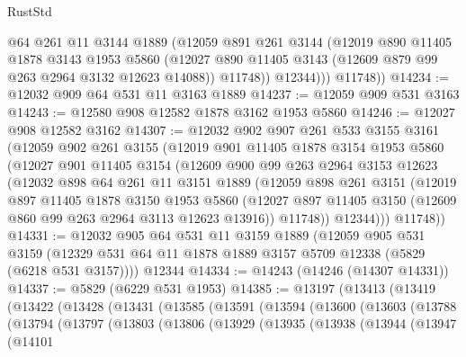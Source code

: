 \begin{lexlean}{RustStd}
\begin{coremodule}
{\begin{coremodule}
{{{{{{{{{{{{{{{{{{{{{{{{{{{{{              @64
              @261
              @11
              @3144
              @1889
              (@12059
                @891
                @261
                @3144
                (@12019
                  @890
                  @11405
                  @1878
                  @3143
                  @1953
                  @5860
                  (@12027 @890 @11405 @3143 (@12609 @879 @99 @263 @2964 @3132 @12623 @14088))
                  @11748))
              @12344)))
        @11748))
@14234 := @12032 @909 @64 @531 @11 @3163 @1889
@14237 := @12059 @909 @531 @3163
@14243 := @12580 @908 @12582 @1878 @3162 @1953 @5860
@14246 := @12027 @908 @12582 @3162
@14307 := @12032
    @902
    @907
    @261
    @533
    @3155
    @3161
    (@12059
      @902
      @261
      @3155
      (@12019
        @901
        @11405
        @1878
        @3154
        @1953
        @5860
        (@12027
          @901
          @11405
          @3154
          (@12609
            @900
            @99
            @263
            @2964
            @3153
            @12623
            (@12032
              @898
              @64
              @261
              @11
              @3151
              @1889
              (@12059
                @898
                @261
                @3151
                (@12019
                  @897
                  @11405
                  @1878
                  @3150
                  @1953
                  @5860
                  (@12027 @897 @11405 @3150 (@12609 @860 @99 @263 @2964 @3113 @12623 @13916))
                  @11748))
              @12344)))
        @11748))
@14331 := @12032
    @905
    @64
    @531
    @11
    @3159
    @1889
    (@12059
      @905
      @531
      @3159
      (@12329 @531 @64 @11 @1878 @1889 @3157 @5709 @12338 (@5829 (@6218 @531 @3157))))
    @12344
@14334 := @14243 (@14246 (@14307 @14331))
@14337 := @5829 (@6229 @531 @1953)
@14385 := @13197
    (@13413
      (@13419
        (@13422
          (@13428
            (@13431
              (@13585
                (@13591
                  (@13594
                    (@13600
                      (@13603
                        (@13788
                          (@13794
                            (@13797
                              (@13803
                                (@13806
                                  (@13929
                                    (@13935
                                      (@13938
                                        (@13944
                                          (@13947
                                            (@14101
}}}}}}}}}}}}}}}}}}}}}}}}}}}}}
\end{coremodule}}
\end{coremodule}
\end{lexlean}

